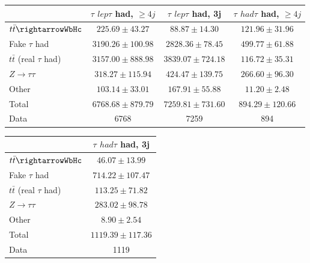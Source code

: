 \begin{table}
\begin{center}
  \begin{tabular}{ | l |  c |  c |  c | }
    \hline \hline 
     &  $\tau$ ${lep}\tau$ {had}, $\geq4j$  &  $\tau$ ${lep}\tau$ {had}, 3j  &  $\tau$ ${had}\tau$ {had}, $\geq4j$  \\ 
    \hline 
     $t\bar{t}\rightarrowWbHc$  &   $ 225.69 \pm 43.27 $ &   $ 88.87 \pm 14.30 $ &   $ 121.96 \pm 31.96 $ \\ 
     Fake $\tau$ {had}  &   $ 3190.26 \pm 100.98 $ &   $ 2828.36 \pm 78.45 $ &   $ 499.77 \pm 61.88 $ \\ 
     $t\bar{t}$ (real $\tau$ {had})  &   $ 3157.00 \pm 888.98 $ &   $ 3839.07 \pm 724.18 $ &   $ 116.72 \pm 35.31 $ \\ 
     $Z\rightarrow\tau\tau$  &   $ 318.27 \pm 115.94 $ &   $ 424.47 \pm 139.75 $ &   $ 266.60 \pm 96.30 $ \\ 
    Other  &   $ 103.14 \pm 33.01 $ &   $ 167.91 \pm 55.88 $ &   $ 11.20 \pm 2.48 $ \\ 
    Total  &   $ 6768.68 \pm 879.79 $ &   $ 7259.81 \pm 731.60 $ &   $ 894.29 \pm 120.66 $ \\ 
    \hline 
    Data  & 6768  & 7259  & 894  \\ 
    \hline \hline 
  \end{tabular} 


  \begin{tabular}{ | l |  c | }
    \hline \hline 
     &  $\tau$ ${had}\tau$ {had}, 3j  \\ 
    \hline 
     $t\bar{t}\rightarrowWbHc$  &   $ 46.07 \pm 13.99 $ \\ 
     Fake $\tau$ {had}  &   $ 714.22 \pm 107.47 $ \\ 
     $t\bar{t}$ (real $\tau$ {had})  &   $ 113.25 \pm 71.82 $ \\ 
     $Z\rightarrow\tau\tau$  &   $ 283.02 \pm 98.78 $ \\ 
    Other  &   $ 8.90 \pm 2.54 $ \\ 
    Total  &   $ 1119.39 \pm 117.36 $ \\ 
    \hline 
    Data  & 1119  \\ 
    \hline \hline 
  \end{tabular} 


\end{center}
\end{table}
